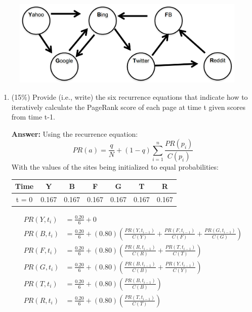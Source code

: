 \documentclass[11pt]{article}
\begin{document}
\begin{enumerate}
        \begin{figure}[!ht]
            \includegraphics[scale=0.5]{graph.png}
            \centering
        \end{figure}

        \begin{enumerate}
            \item (15\%) Provide (i.e., write) the six recurrence equations that indicate how to iteratively calculate the PageRank score of each page at time t given scores from time t-1.

            \textbf{Answer:}
            Using the recurrence equation:
            \begin{equation}
                PR(a)=\frac{q}{N}+(1-q)\sum_{i=1}^{n}\frac{PR(p_i)}{C(p_i)}
            \end{equation}
            With the values of the sites being initialized to equal probabilities:
            \begin{table}[!ht]
                \centering
                \begin{tabular}[t]{|c|c|c|c|c|c|c|}
                    \hline
                    \textbf{Time} & \textbf{Y} & \textbf{B} & \textbf{F} & \textbf{G} & \textbf{T} & \textbf{R} \\
                    \hline
                    t = 0 & 0.167 & 0.167 & 0.167 & 0.167 & 0.167 & 0.167
                    \\ \hline
                \end{tabular}
            \end{table}
            \begin{align*}
                PR(Y,t_{i}) &= \frac{0.20}{6}+0 \\
                PR(B,t_{i}) &= \frac{0.20}{6}+(0.80)\left(\frac{PR(Y,t_{i-1})}{C(Y)}+\frac{PR(F,t_{i-1})}{C(F)}+\frac{PR(G,t_{i-1})}{C(G)}\right) \\
                PR(F,t_{i}) &= \frac{0.20}{6}+(0.80)\left(\frac{PR(R,t_{i-1})}{C(R)}+\frac{PR(T,t_{i-1})}{C(T)}\right) \\
                PR(G,t_{i}) &= \frac{0.20}{6}+(0.80)\left(\frac{PR(B,t_{i-1})}{C(B)}+\frac{PR(Y,t_{i-1})}{C(Y)}\right) \\
                PR(T,t_{i}) &= \frac{0.20}{6}+(0.80)\left(\frac{PR(B,t_{i-1})}{C(B)}\right) \\
                PR(R,t_{i}) &= \frac{0.20}{6}+(0.80)\left(\frac{PR(T,t_{i-1})}{C(T)}\right)
            \end{align*}


\end{enumerate}
\end{enumerate}
\end{document}
